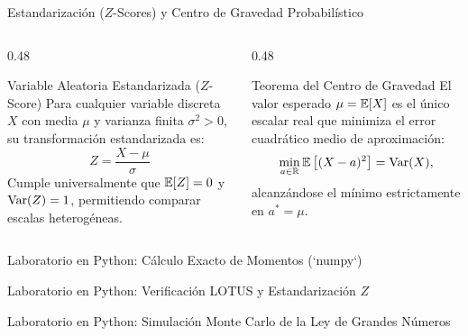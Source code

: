 \documentclass[10pt, aspectratio=169]{beamer}
\begin{document}
\begin{frame}{Estandarización ($Z$-Scores) y Centro de Gravedad Probabilístico}
  \begin{columns}[T]
    \begin{column}{0.48\textwidth}
      \begin{block}{Variable Aleatoria Estandarizada ($Z$-Score)}
        \footnotesize
        Para cualquier variable discreta $X$ con media $\mu$ y varianza finita $\sigma^2 > 0$, su transformación estandarizada es:
        $$Z = \dfrac{X - \mu}{\sigma}$$
        Cumple universalmente que $\mathbb{E}[Z] = 0$ y $\operatorname{Var}(Z) = 1$, permitiendo comparar escalas heterogéneas.
      \end{block}
    \end{column}
    \begin{column}{0.48\textwidth}
      \pause
      \begin{alertblock}{Teorema del Centro de Gravedad}
        \footnotesize
        El valor esperado $\mu = \mathbb{E}[X]$ es el único escalar real que minimiza el error cuadrático medio de aproximación:
        $$\min_{a \in \mathbb{R}} \mathbb{E}\left[ (X - a)^2 \right] = \operatorname{Var}(X),$$
        alcanzándose el mínimo estrictamente en $a^* = \mu$.
      \end{alertblock}
    \end{column}
  \end{columns}
\end{frame}

\begin{frame}[fragile]{Laboratorio en Python: Cálculo Exacto de Momentos (`numpy`)}
  
\end{frame}

\begin{frame}[fragile]{Laboratorio en Python: Verificación LOTUS y Estandarización $Z$}
  
\end{frame}

\begin{frame}[fragile]{Laboratorio en Python: Simulación Monte Carlo de la Ley de Grandes Números}
  
\end{frame}
\end{document}
